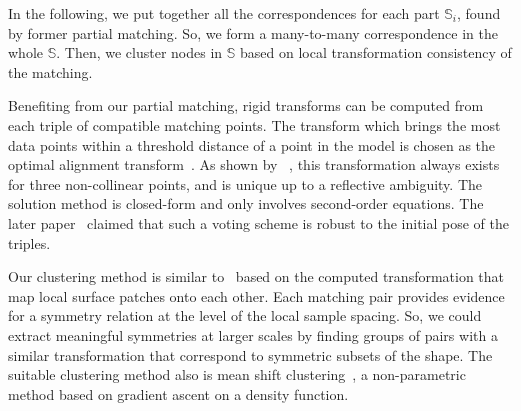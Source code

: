 In the following, we put together all the correspondences for each part $\mathbb{S}_i$, found by former partial matching.
So, we form a many-to-many correspondence in the whole $\mathbb{S}$.  
Then, we cluster nodes in $\mathbb{S}$ based on local transformation consistency of the matching.

Benefiting from our partial matching, rigid transforms can be computed from each triple of compatible matching points.
The transform which brings the most data points within a threshold distance of a point in the model is chosen as the optimal alignment transform~\cite{Huttenlocher1990}.
As shown by ~\cite{Huttenlocher1990}, this transformation always exists for three non-collinear points, and is unique up to a reflective ambiguity. 
The solution method is closed-form and only involves second-order equations.
The later paper~\cite{Gelfand05} claimed that such a voting scheme is robust to the initial pose of the triples.

Our clustering method is similar to~\cite{mitra2006} based on the computed transformation that map local surface patches onto each other.
Each matching pair provides evidence for a symmetry relation at the level of the local sample spacing. 
So, we could extract meaningful symmetries at larger scales by finding groups of pairs with a similar transformation 
that correspond to symmetric subsets of the shape.
The suitable clustering method also is mean shift clustering~\cite{Comaniciu2002}, a non-parametric method based on gradient ascent on a density function.










